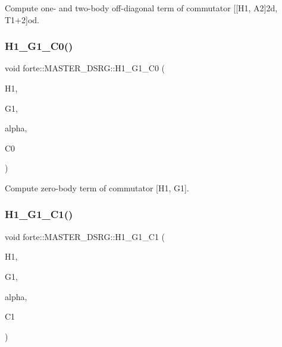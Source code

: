 Compute one-\/ and two-\/body off-\/diagonal term of commutator \mbox{[}\mbox{[}H1, A2\mbox{]}2d, T1+2\mbox{]}od. 

\mbox{\label{classforte_1_1_m_a_s_t_e_r___d_s_r_g_a6f2f3067147bde13e729d4cac28d0dcc}} 
\subsubsection{\texorpdfstring{H1\+\_\+\+G1\+\_\+\+C0()}{H1\_G1\_C0()}}
{\footnotesize\ttfamily void forte\+::\+M\+A\+S\+T\+E\+R\+\_\+\+D\+S\+R\+G\+::\+H1\+\_\+\+G1\+\_\+\+C0 (\begin{DoxyParamCaption}\item[{Blocked\+Tensor \&}]{H1,  }\item[{Blocked\+Tensor \&}]{G1,  }\item[{const double \&}]{alpha,  }\item[{double \&}]{C0 }\end{DoxyParamCaption})\hspace{0.3cm}{\ttfamily [protected]}}



Compute zero-\/body term of commutator \mbox{[}H1, G1\mbox{]}. 

\mbox{\label{classforte_1_1_m_a_s_t_e_r___d_s_r_g_ac7f2504a87fc3acdca92b6b5893db3d0}} 
\subsubsection{\texorpdfstring{H1\+\_\+\+G1\+\_\+\+C1()}{H1\_G1\_C1()}}
{\footnotesize\ttfamily void forte\+::\+M\+A\+S\+T\+E\+R\+\_\+\+D\+S\+R\+G\+::\+H1\+\_\+\+G1\+\_\+\+C1 (\begin{DoxyParamCaption}\item[{Blocked\+Tensor \&}]{H1,  }\item[{Blocked\+Tensor \&}]{G1,  }\item[{const double \&}]{alpha,  }\item[{Blocked\+Tensor \&}]{C1 }\end{DoxyParamCaption})\hspace{0.3cm}{\ttfamily [protected]}}



